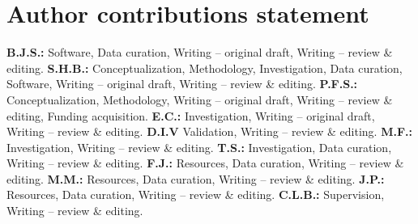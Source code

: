 \documentclass[unnumsec,webpdf,contemporary,large]{oup-authoring-template}
\begin{document}
\section{Author contributions statement}
\textbf{B.J.S.:} Software, Data curation, Writing – original draft, Writing
– review \& editing. \textbf{S.H.B.:} Conceptualization, Methodology,
Investigation, Data curation, Software, Writing – original draft, Writing –
review \& editing. \textbf{P.F.S.:} Conceptualization, Methodology, Writing
– original draft, Writing – review \& editing, Funding
acquisition. \textbf{E.C.:} Investigation, Writing – original draft,
Writing – review \& editing. \textbf{D.I.V} Validation, Writing – review \&
editing. \textbf{M.F.:} Investigation, Writing – review \&
editing. \textbf{T.S.:} Investigation, Data curation, Writing – review \&
editing. \textbf{F.J.:} Resources, Data curation, Writing – review \&
editing. \textbf{M.M.:} Resources, Data curation, Writing – review \&
editing. \textbf{J.P.:} Resources, Data curation, Writing – review \&
editing. \textbf{C.L.B.:} Supervision, Writing – review \& editing.




\end{document}
